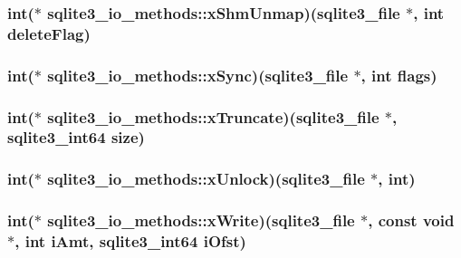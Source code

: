 \hypertarget{structsqlite3__io__methods_af69cbc7ece1854576ac262f986871563}{
\subsubsection[{x\-Shm\-Unmap}]{\setlength{\rightskip}{0pt plus 5cm}int($\ast$ sqlite3\-\_\-io\-\_\-methods\-::x\-Shm\-Unmap)({\bf sqlite3\-\_\-file} $\ast$, int delete\-Flag)}}\label{structsqlite3__io__methods_af69cbc7ece1854576ac262f986871563}
\hypertarget{structsqlite3__io__methods_a8d39ac02aeb1eb63622008217031b098}{
\subsubsection[{x\-Sync}]{\setlength{\rightskip}{0pt plus 5cm}int($\ast$ sqlite3\-\_\-io\-\_\-methods\-::x\-Sync)({\bf sqlite3\-\_\-file} $\ast$, int flags)}}\label{structsqlite3__io__methods_a8d39ac02aeb1eb63622008217031b098}
\hypertarget{structsqlite3__io__methods_a981cc60fc305bfb38eecd7123a513a20}{
\subsubsection[{x\-Truncate}]{\setlength{\rightskip}{0pt plus 5cm}int($\ast$ sqlite3\-\_\-io\-\_\-methods\-::x\-Truncate)({\bf sqlite3\-\_\-file} $\ast$, {\bf sqlite3\-\_\-int64} size)}}\label{structsqlite3__io__methods_a981cc60fc305bfb38eecd7123a513a20}
\hypertarget{structsqlite3__io__methods_ac90eeb9153eb6608a1872760660e718f}{
\subsubsection[{x\-Unlock}]{\setlength{\rightskip}{0pt plus 5cm}int($\ast$ sqlite3\-\_\-io\-\_\-methods\-::x\-Unlock)({\bf sqlite3\-\_\-file} $\ast$, int)}}\label{structsqlite3__io__methods_ac90eeb9153eb6608a1872760660e718f}
\hypertarget{structsqlite3__io__methods_a803b39bc86bbff522602597fa4390e0f}{
\subsubsection[{x\-Write}]{\setlength{\rightskip}{0pt plus 5cm}int($\ast$ sqlite3\-\_\-io\-\_\-methods\-::x\-Write)({\bf sqlite3\-\_\-file} $\ast$, const void $\ast$, int i\-Amt, {\bf sqlite3\-\_\-int64} i\-Ofst)}}\label{structsqlite3__io__methods_a803b39bc86bbff522602597fa4390e0f}



